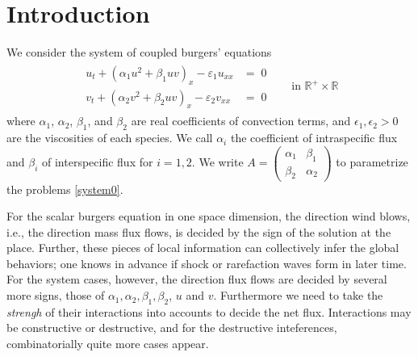 \documentclass{amsart}
\theoremstyle{definition}
\numberwithin{equation}{section}
\begin{document}
\section{Introduction}
We consider the system of coupled burgers' equations
\begin{align}\label{system0} %
\begin{aligned}
u_{t} + ( \alpha_{1}u^{2} + \beta_{1}uv )_{x} -\varepsilon_1 u_{xx} &= \; 0 \\
v_{t} + ( \alpha_{2}v^{2} + \beta_{2}uv )_{x} -\varepsilon_2 v_{xx} &= \; 0 
\end{aligned} \quad &\text{in $\mathbb{R}^+\times \mathbb{R}$}
\end{align}
where $\alpha_1$, $\alpha_2$, $\beta_1$, and $\beta_2 $ are real coefficients of convection terms, and $\epsilon_1, \epsilon_2 >0$ are the viscosities of each species. We call $\alpha_i$ the coefficient of intraspecific flux and $\beta_i$ of interspecific flux for $i=1,2$. We write $A = \begin{pmatrix}                                                 \alpha_1 & \beta_1\\  \beta_2 & \alpha_2  \end{pmatrix}$ to parametrize the problems \eqref{system0}. 

For the scalar burgers equation in one space dimension, the direction wind blows, i.e., the direction mass flux flows, is decided by the sign of the solution at the place. Further, these pieces of local information can collectively infer the global behaviors; one knows in advance if shock or rarefaction waves form in later time. For the system cases, however, the direction flux flows are decided by several more signs, those of $\alpha_1, \alpha_2, \beta_1, \beta_2$, $u$ and $v$. Furthermore we need to take  the {\it strengh} of their interactions into accounts to decide the net flux. Interactions may be constructive or destructive, and for the destructive inteferences, combinatorially quite more cases appear.%
\end{document}
